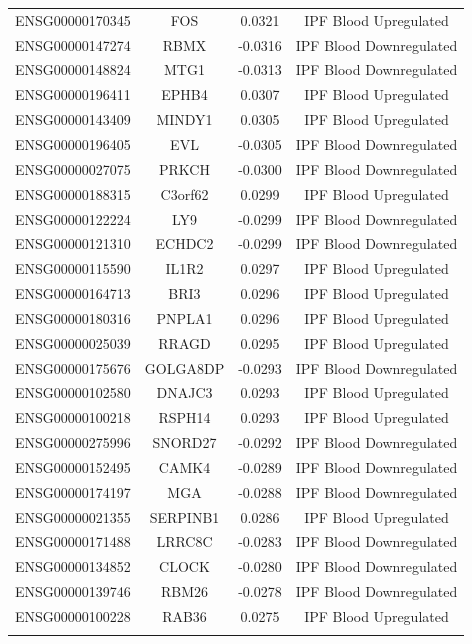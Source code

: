 \documentclass[
]{article}
\begin{document}
\begin{singlespace}
\begin{longtable}[t]{lccc}
\addlinespace
ENSG00000170345 & FOS & 0.0321 & IPF Blood Upregulated\\
ENSG00000147274 & RBMX & -0.0316 & IPF Blood Downregulated\\
ENSG00000148824 & MTG1 & -0.0313 & IPF Blood Downregulated\\
ENSG00000196411 & EPHB4 & 0.0307 & IPF Blood Upregulated\\
ENSG00000143409 & MINDY1 & 0.0305 & IPF Blood Upregulated\\
\addlinespace
ENSG00000196405 & EVL & -0.0305 & IPF Blood Downregulated\\
ENSG00000027075 & PRKCH & -0.0300 & IPF Blood Downregulated\\
ENSG00000188315 & C3orf62 & 0.0299 & IPF Blood Upregulated\\
ENSG00000122224 & LY9 & -0.0299 & IPF Blood Downregulated\\
ENSG00000121310 & ECHDC2 & -0.0299 & IPF Blood Downregulated\\
\addlinespace
ENSG00000115590 & IL1R2 & 0.0297 & IPF Blood Upregulated\\
ENSG00000164713 & BRI3 & 0.0296 & IPF Blood Upregulated\\
ENSG00000180316 & PNPLA1 & 0.0296 & IPF Blood Upregulated\\
ENSG00000025039 & RRAGD & 0.0295 & IPF Blood Upregulated\\
ENSG00000175676 & GOLGA8DP & -0.0293 & IPF Blood Downregulated\\
\addlinespace
ENSG00000102580 & DNAJC3 & 0.0293 & IPF Blood Upregulated\\
ENSG00000100218 & RSPH14 & 0.0293 & IPF Blood Upregulated\\
ENSG00000275996 & SNORD27 & -0.0292 & IPF Blood Downregulated\\
ENSG00000152495 & CAMK4 & -0.0289 & IPF Blood Downregulated\\
ENSG00000174197 & MGA & -0.0288 & IPF Blood Downregulated\\
\addlinespace
ENSG00000021355 & SERPINB1 & 0.0286 & IPF Blood Upregulated\\
ENSG00000171488 & LRRC8C & -0.0283 & IPF Blood Downregulated\\
ENSG00000134852 & CLOCK & -0.0280 & IPF Blood Downregulated\\
ENSG00000139746 & RBM26 & -0.0278 & IPF Blood Downregulated\\
ENSG00000100228 & RAB36 & 0.0275 & IPF Blood Upregulated\\
\addlinespace

\end{longtable}
\end{singlespace}
\end{document}
